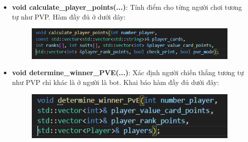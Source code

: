 \documentclass{article}
\begin{document}
\begin{itemize}
    \item \textbf{void calculate\_player\_points(...)}: Tính điểm cho từng người chơi tương tự như PVP. Hàm đầy đủ ở dưới dây:
    \begin{figure}[h!]
        \centering
        \includegraphics[width=1\textwidth]{images/screenshot/cal_player_2.png}
    \end{figure}
    \item \textbf{void determine\_winner\_PVE(...)}: Xác định người chiến thắng tương tự như PVP chỉ khác là ở người là bot. Khai báo hàm đầy đủ dưới đây:
    \begin{figure}[h!]
        \centering
        \includegraphics[width=1\textwidth]{images/screenshot/det_winner_pve.png}
    \end{figure}
    \
\end{itemize}
\end{document}
